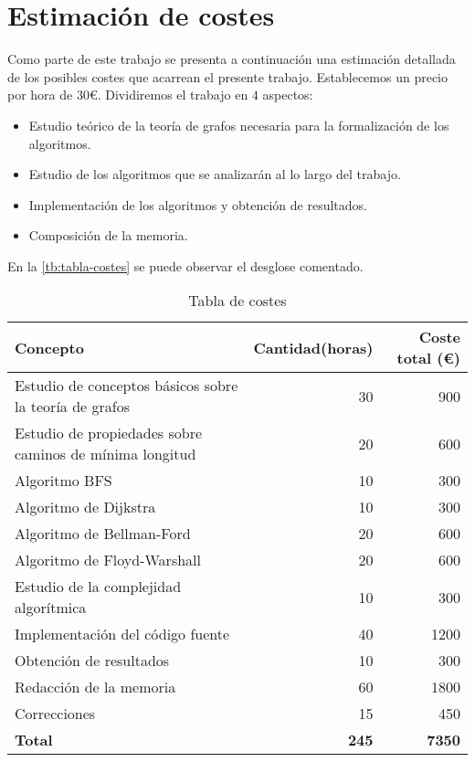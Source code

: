 
\chapter{Estimación de costes}\label{ap:apendice2}

Como parte de este trabajo se presenta a continuación una estimación detallada de los posibles costes que acarrean el presente trabajo. Establecemos un precio por hora de $30$€. Dividiremos el trabajo en $4$ aspectos:

\begin{itemize}
	\item Estudio teórico de la teoría de grafos necesaria para la formalización de los algoritmos.
	\item Estudio de los algoritmos que se analizarán al lo largo del trabajo.
	\item Implementación de los algoritmos y obtención de resultados.
	\item Composición de la memoria.
\end{itemize}

En la \autoref{tb:tabla-costes} se puede observar el desglose comentado.

\begin{table}[htpb]
	\centering
	\begin{tabular}{lrr} \toprule
		\textbf{Concepto} & \textbf{Cantidad(horas)} & \textbf{Coste total (€)}          \\ \toprule
		Estudio de conceptos básicos sobre la teoría de grafos & 30 & 900          \\ 
		Estudio de propiedades sobre caminos de mínima longitud & 20 & 600          \\ \bottomrule
		Algoritmo BFS & 10 & 300          \\ 
		Algoritmo de Dijkstra & 10 & 300          \\
		Algoritmo de Bellman-Ford & 20 & 600          \\ 
		Algoritmo de Floyd-Warshall & 20 & 600          \\
		Estudio de la complejidad algorítmica & 10 & 300          \\  \bottomrule
		Implementación del código fuente & 40 & 1200 \\ 
		Obtención de resultados & 10 & 300 \\ \bottomrule
		Redacción de la memoria & 60 & 1800          \\ 
		Correcciones & 15 & 450          \\ \bottomrule
		\textbf{Total} & \textbf{245} & \textbf{7350}          \\ \bottomrule
	\end{tabular}
	\caption{Tabla de costes}
	\label{tb:tabla-costes}
\end{table}

\endinput
